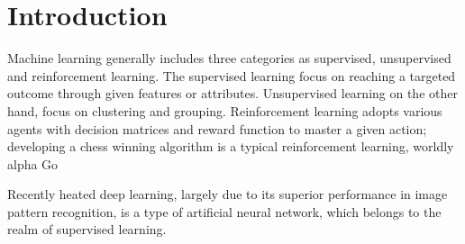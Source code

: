 \section{Introduction}

Machine learning generally includes three categories as supervised, unsupervised and reinforcement learning. The supervised learning focus on reaching a targeted outcome through given features or attributes. Unsupervised learning on the other hand, focus on clustering and grouping. Reinforcement learning adopts various agents with decision matrices and reward function to master a given action; developing a chess winning algorithm is a typical reinforcement learning, worldly alpha Go
\par
Recently heated deep learning, largely due to its superior performance in image pattern recognition, is a type of artificial neural network, which belongs to the realm of supervised learning. 
